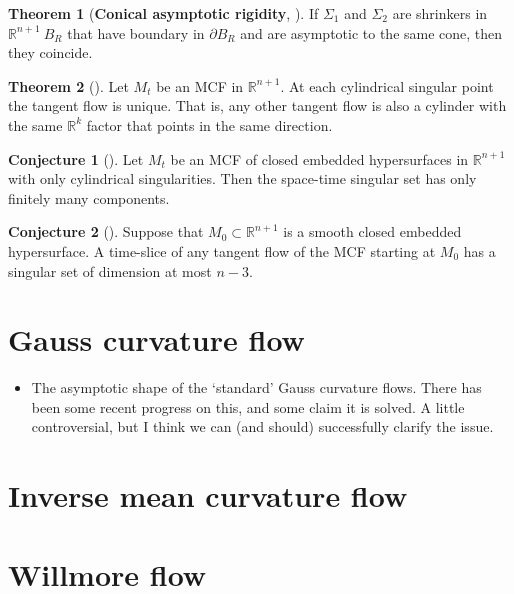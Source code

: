 \documentclass{amsart}
\theoremstyle{definition}
\newtheorem{Thm}{Theorem}[section]
\newtheorem{Con}{Conjecture}[section]
\begin{document}
\begin{Thm}[\textbf{Conical asymptotic rigidity}, \cite{Wang 2014}]
If ${\Sigma}_{1}$ and ${\Sigma}_{2}$ are shrinkers in ${\mathbb{R}}^{n+1} \ B_{R}$ that have boundary in $\partial B_{R}$ 
and are asymptotic to the same cone, then they coincide.
\end{Thm}

 \begin{Thm}[\cite{Colding Minicozzi 2015a}] Let ${M}_{t}$ be an MCF in ${\mathbb{R}}^{n+1}$. At each cylindrical singular 
 point the tangent flow is unique. That is, any other tangent flow is also a cylinder with the same ${\mathbb{R}}^{k}$ factor 
 that points in the same direction.
\end{Thm}
   
\begin{Con}[\cite{Colding Minicozzi 2016}]  
  Let ${M}_{t}$ be an MCF of closed embedded hypersurfaces in ${\mathbb{R}}^{n+1}$ with only cylindrical singularities. Then 
  the space-time singular set has only finitely many components.
\end{Con}

\begin{Con}[\cite{Ilmanen 1995}]  
 Suppose that  ${M}_{0}  \subset {\mathbb{R}}^{n+1}$ is a smooth closed embedded hypersurface. A time-slice of any tangent flow of the MCF starting at 
  ${M}_{0}$ has a singular set of dimension at most $n-3$.
\end{Con}

\newpage

\section{Gauss curvature flow}

\begin{itemize}
\item The asymptotic shape of the `standard' Gauss curvature flows. There has been some recent progress on this, and some claim it is solved. A little controversial, but I think we can (and should) successfully clarify the issue.
\end{itemize}
  
\section{Inverse mean curvature flow}

\section{Willmore flow}
\end{document}
